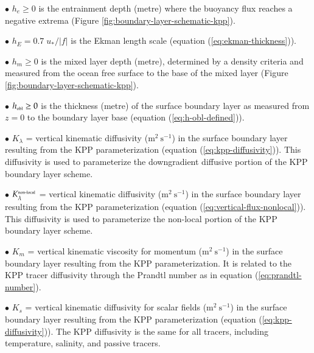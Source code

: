 \begin{trivlist}
\item[$\bullet$] $h_{e} \ge 0$ is the entrainment depth (metre) where
  the buoyancy flux reaches a negative extrema (Figure
  \ref{fig:boundary-layer-schematic-kpp}).

\item[$\bullet$] $h_{E} = 0.7 \; u_{*} /|f|$ is the Ekman length scale
  (equation (\ref{eq:ekman-thickness})).

\item[$\bullet$] $h_{m} \ge 0$ is the mixed layer depth (metre),
  determined by a density criteria and measured from the ocean free
  surface to the base of the mixed layer (Figure
  \ref{fig:boundary-layer-schematic-kpp}).

\item[$\bullet$] $h_{\mbox{\tiny obl}} \ge 0$ is the thickness (metre) of the
  surface boundary layer as measured from $z=0$ to the boundary layer
  base (equation (\ref{eq:h-obl-defined})).

\item[$\bullet$] $K_{\lambda}$ = vertical kinematic diffusivity
  ($\mbox{m}^{2}~\mbox{s}^{-1}$) in the surface boundary layer
  resulting from the KPP parameterization (equation
  (\ref{eq:kpp-diffusivity})).  This diffusivity is used to
  parameterize the downgradient diffusive portion of the KPP boundary
  layer scheme.

\item[$\bullet$] $K^{\mbox{\tiny non-local}}_{\lambda}$ = vertical
  kinematic diffusivity ($\mbox{m}^{2}~\mbox{s}^{-1}$) in the surface
  boundary layer resulting from the KPP parameterization (equation
  (\ref{eq:vertical-flux-nonlocal})).  This diffusivity is used to
  parameterize the non-local portion of the KPP boundary layer scheme.

\item[$\bullet$] $K_{m}$ = vertical kinematic viscosity for momentum
  ($\mbox{m}^{2}~\mbox{s}^{-1}$) in the surface boundary layer
  resulting from the KPP parameterization.  It is related to the KPP
  tracer diffusivity through the Prandtl number as in equation
  (\ref{eq:prandtl-number}).

\item[$\bullet$] $K_{s}$ = vertical kinematic diffusivity for scalar
  fields ($\mbox{m}^{2}~\mbox{s}^{-1}$) in the surface boundary layer
  resulting from the KPP parameterization (equation
  (\ref{eq:kpp-diffusivity})).  The KPP diffusivity is the same for
  all tracers, including temperature, salinity, and passive tracers.


\end{trivlist}
